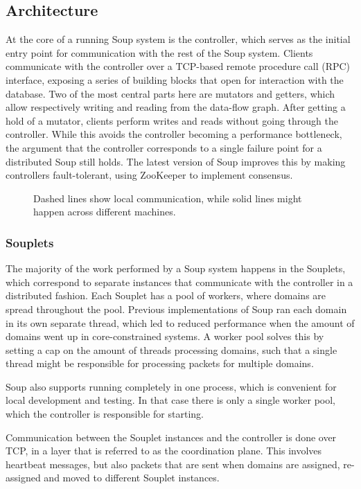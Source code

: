 \documentclass[b5paper]{report}
\begin{document}
\subsection{Architecture}
At the core of a running Soup system is the controller, which serves as the
initial entry point for communication with the rest of the Soup system. Clients
communicate with the controller over a TCP-based remote procedure call (RPC)
interface, exposing a series of building blocks that open for interaction with
the database. Two of the most central parts here are mutators and getters, which
allow respectively writing and reading from the data-flow graph. After getting a
hold of a mutator, clients perform writes and reads without going through the
controller. While this avoids the controller becoming a performance bottleneck,
the argument that the controller corresponds to a single failure point for a
distributed Soup still holds. The latest version of Soup improves this by making
controllers fault-tolerant, using ZooKeeper \cite{zookeeper} to implement
consensus.

\begin{figure}[H]
  \centering
  
  \caption{
    Dashed lines show local communication, while solid lines might happen across
    different machines.
  }
\end{figure}

\subsubsection{Souplets}
The majority of the work performed by a Soup system happens in the Souplets,
which correspond to separate instances that communicate with the controller in a
distributed fashion. Each Souplet has a pool of workers, where domains are
spread throughout the pool. Previous implementations of Soup ran each domain in
its own separate thread, which led to reduced performance when the amount of
domains went up in core-constrained systems. A worker pool solves this by
setting a cap on the amount of threads processing domains, such that a single
thread might be responsible for processing packets for multiple domains.

Soup also supports running completely in one process, which is convenient for
local development and testing. In that case there is only a single worker pool,
which the controller is responsible for starting.

Communication between the Souplet instances and the controller is done over TCP,
in a layer that is referred to as the coordination plane. This involves
heartbeat messages, but also packets that are sent when domains are assigned,
re-assigned and moved to different Souplet instances.
\end{document}
